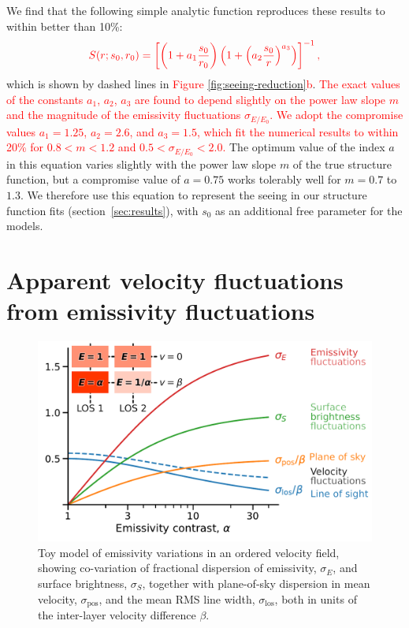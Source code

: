 \documentclass[fleqn,usenatbib, useAMS, a4paper]{mnras}
\newcommand\pos{\ensuremath{_{\mathrm{pos}}}}
\newcommand\los{\ensuremath{_{\mathrm{los}}}}
\newcommand\shortsig[1]{\ensuremath{\sigma_{#1/#1_0}}}
\begin{document}
We find that the following simple analytic function reproduces
these results to within better than 10\%:
\begin{equation}\label{eq:seeingemp2}\color{red}
S(r; s_0, r_0) = 
  \left [
\left (1+a_1\frac{s_0}{r_0} \right) 
\left(1+ \left (a_2 \frac{ s_0}{r} \right) ^{a_3} \right)
  \right ]^{-1} ,
\end{equation}
which is shown by dashed lines in \textcolor{red}{Figure \ref{fig:seeing-reduction}b}.
\textcolor{red}{%
  The exact values of the constants \(a_1\), \(a_2\), \(a_3\)
  are found to depend slightly on the power law slope \(m\)
  and the magnitude of the emissivity fluctuations \(\shortsig{E}\).
  We adopt the compromise values \(a_1 = 1.25\),
  \(a_2 = 2.6\), and \(a_3 = 1.5\), which fit the numerical results to
  within 20\% for \(0.8 < m < 1.2\) and \(0.5 < \shortsig{E} < 2.0\).}
The optimum value of the index \(a\) in this equation varies slightly
with the power law slope \(m\) of the true structure function,
but a compromise value of \(a = 0.75\) works tolerably well for \(m = 0.7\) to \(1.3\).
We therefore use this equation to represent the seeing
in our structure function fits (section~\ref{sec:results}),
with \(s_0\) as an additional free parameter for the models.
\clearpage

\section{Apparent velocity fluctuations from emissivity fluctuations}
\label{sec:appar-veloc-fluct}

\begin{figure}
  \centering
  \includegraphics[width=\linewidth]{Figures/bright-to-vel-fluct-annotated}
  \caption{
    Toy model of emissivity variations in an ordered velocity field,
    showing co-variation of fractional dispersion of
    emissivity, \(\sigma_E\), and surface brightness, \(\sigma_S\),
    together with plane-of-sky dispersion in mean velocity,
    \(\sigma\pos\),
    and the mean RMS line width, \(\sigma\los\),
    both in units of the inter-layer velocity difference \(\beta\).
  }
  \label{fig:bright-to-vel-fluct}
\end{figure}
\end{document}
